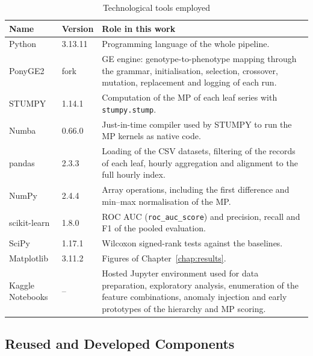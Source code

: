 \begin{table}[H]
    \centering
    \caption{Technological tools employed}
    \label{tab:tools}
    \begin{tabularx}{\textwidth}{llX}
        \toprule
        Name & Version & Role in this work \\
        \midrule
        Python & 3.13.11 & Programming language of the whole pipeline. \\
        PonyGE2 & fork & \ac{GE} engine: genotype-to-phenotype mapping through the grammar, initialisation, selection, crossover, mutation, replacement and logging of each run. \\
        STUMPY & 1.14.1 & Computation of the \ac{MP} of each leaf series with \texttt{stumpy.stump}. \\
        Numba & 0.66.0 & Just-in-time compiler used by STUMPY to run the \ac{MP} kernels as native code. \\
        pandas & 2.3.3 & Loading of the CSV datasets, filtering of the records of each leaf, hourly aggregation and alignment to the full hourly index. \\
        NumPy & 2.4.4 & Array operations, including the first difference and min--max normalisation of the \ac{MP}. \\
        scikit-learn & 1.8.0 & \ac{ROC} \ac{AUC} (\texttt{roc\_auc\_score}) and precision, recall and F1 of the pooled evaluation. \\
        SciPy & 1.17.1 & Wilcoxon signed-rank tests against the baselines. \\
        Matplotlib & 3.11.2 & Figures of Chapter~\ref{chap:results}. \\
        Kaggle Notebooks & -- & Hosted Jupyter environment used for data preparation, exploratory analysis, enumeration of the feature combinations, anomaly injection and early prototypes of the hierarchy and \ac{MP} scoring. \\
        \bottomrule
    \end{tabularx}
\end{table}

\subsection{Reused and Developed Components}

